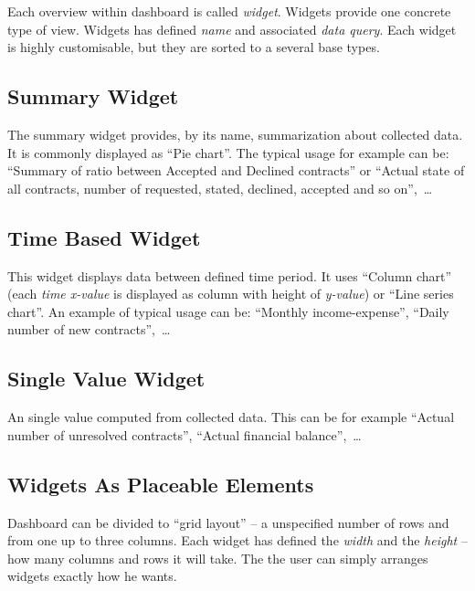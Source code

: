 Each overview within dashboard is called \textit{widget}. Widgets provide one concrete type of view. Widgets has defined \textit{name} and associated \textit{data query}. Each widget is highly customisable, but they are sorted to a several base types.

\subsection{Summary Widget}
The summary widget provides, by its name, summarization about collected data. It is commonly displayed as ``Pie chart''. The typical usage for example can be: ``Summary of ratio between Accepted and Declined contracts'' or ``Actual state of all contracts, number of requested, stated, declined, accepted and so on'',~\dots

\subsection{Time Based Widget}
This widget displays data between defined time period. It uses ``Column chart''  (each \textit{time x-value} is displayed as column with height of \textit{y-value}) or ``Line series chart''. An example of typical usage can be: ``Monthly income-expense'', ``Daily number of new contracts'',~\dots

\subsection{Single Value Widget}
An single value computed from collected data. This can be for example ``Actual number of unresolved contracts'', ``Actual financial balance'',~\dots 

\subsection{Widgets As Placeable Elements}
Dashboard can be divided to ``grid layout'' -- a unspecified number of rows and from one up to three columns. Each widget has defined the \textit{width} and the \textit{height} -- how many columns and rows it will take. The the user can simply arranges widgets exactly how he wants.


\section{}
\section{}
